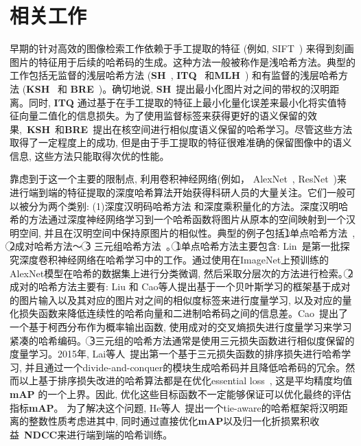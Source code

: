 \section{相关工作}
早期的针对高效的图像检索工作依赖于手工提取的特征 (例如, SIFT~\cite{lowe2004distinctive}) 来得到刻画图片的特征用于后续的哈希码的生成。这种方法一般被称作是浅哈希方法。典型的工作包括无监督的浅层哈希方法 (\textbf{SH}~\cite{weiss2008spectral}, \textbf{ITQ}~\cite{gong2012iterative} 和\textbf{MLH}~\cite{norouzi2011minimal}) 和有监督的浅层哈希方法 (\textbf{KSH}~\cite{liu2012supervised} 和 \textbf{BRE}~\cite{kulis2009learning})。确切地说, \textbf{SH}~\cite{weiss2008spectral}提出最小化图片对之间的带权的汉明距离。同时, \textbf{ITQ} 通过基于在手工提取的特征上最小化量化误差来最小化将实值特征向量二值化的信息损失。为了使用监督标签来获得更好的语义保留的效果,~\textbf{KSH}~\cite{liu2012supervised}和\textbf{BRE}~\cite{kulis2009learning}提出在核空间进行相似度语义保留的哈希学习。尽管这些方法取得了一定程度上的成功, 但是由于手工提取的特征很难准确的保留图像中的语义信息, 这些方法只能取得次优的性能。\par
靠虑到于这一个主要的限制点, 利用卷积神经网络(例如， AlexNet~\cite{krizhevsky2012imagenet}, ResNet~\cite{he2016deep})来进行端到端的特征提取的深度哈希算法开始获得科研人员的大量关注。它们一般可以被分为两个类别: (1)深度汉明码哈希方法 和深度乘积量化的方法。深度汉明哈希的方法通过深度神经网络学习到一个哈希函数将图片从原本的空间映射到一个汉明空间, 并且在汉明空间中保持原图片的相似性。典型的例子包括\textcircled{1}单点哈希方法~\cite{lin2015deep}, \textcircled{2}成对哈希方法～\cite{liu2016deep,cao2017hashnet,cao2018deep,fan2020deep} \textcircled{3} 三元组哈希方法~\cite{lai2015simultaneous,wang2016deep,li2019triplet}。\textcircled{1}单点哈希方法主要包含: Lin~\cite{lin2015deep}是第一批探究深度卷积神经网络在哈希学习中的工作。通过使用在ImageNet上预训练的AlexNet模型在哈希的数据集上进行分类微调, 然后采取分层次的方法进行检索。\textcircled{2}成对的哈希方法主要有: Liu 和 Cao等人\cite{liu2016deep,cao2017hashnet}提出基于一个贝叶斯学习的框架基于成对的图片输入以及其对应的图片对之间的相似度标签来进行度量学习, 以及对应的量化损失函数来降低连续性的哈希向量和二进制哈希码之间的信息差。Cao~\cite{cao2018deep}提出了一个基于柯西分布作为概率输出函数, 使用成对的交叉熵损失进行度量学习来学习紧凑的哈希编码。 \textcircled{3}三元组的哈希方法通常是使用三元损失函数进行相似度保留的度量学习。2015年, Lai等人~\cite{lai2015simultaneous}提出第一个基于三元损失函数的排序损失进行哈希学习, 并且通过一个divide-and-conquer的模块生成哈希码并且降低哈希码的冗余。然而以上基于排序损失改进的哈希算法都是在优化essential loss~\cite{liu2011learning}, 这是平均精度均值\textbf{mAP} 的一个上界。因此, 优化这些目标函数不一定能够保证可以优化最终的评估指标\textbf{mAP}。 为了解决这个问题, He等人~\cite{he2018hashing}提出一个tie-aware的哈希框架将汉明距离的整数性质考虑进其中, 同时通过直接优化\textbf{mAP}以及归一化折损累积收益~\textbf{NDCC}来进行端到端的哈希训练。\par
